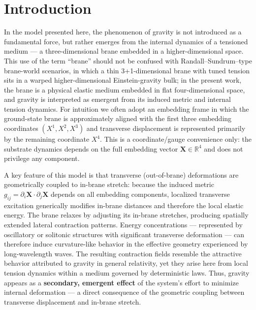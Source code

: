 \section{Introduction}\label{introduction}

In the model presented here, the phenomenon of gravity is not introduced
as a fundamental force, but rather emerges from the internal dynamics of
a tensioned medium --- a three-dimensional brane embedded in a
higher-dimensional space. This use of the term ``brane'' should not be confused with Randall--Sundrum--type brane-world scenarios, in which a thin 3+1-dimensional brane with tuned tension sits in a warped higher-dimensional Einstein-gravity bulk; in the present work, the brane is a physical elastic medium embedded in flat four-dimensional space, and gravity is interpreted as emergent from its induced metric and internal tension dynamics. For intuition we often adopt an embedding frame in which the ground-state brane is approximately aligned with the first three embedding coordinates $(X^1,X^2,X^3)$ and transverse displacement is represented primarily by the remaining coordinate $X^4$. This is a coordinate/gauge convenience only: the substrate dynamics depends on the full embedding vector $\mathbf X\in\mathbb R^4$ and does not privilege any component.

A key feature of this model is that transverse (out-of-brane) deformations are
geometrically coupled to in-brane stretch: because the induced metric
$g_{ij}=\partial_i\mathbf X\cdot\partial_j\mathbf X$ depends on all embedding
components, localized transverse excitation generically modifies in-brane
distances and therefore the local elastic energy. The brane relaxes by adjusting
its in-brane stretches, producing spatially extended lateral contraction
patterns. Energy concentrations --- represented by oscillatory or solitonic
structures with significant transverse deformation --- can therefore induce
curvature-like behavior in the effective geometry experienced by long-wavelength
waves. The resulting contraction fields resemble the attractive behavior
attributed to gravity in general relativity, yet they arise here from local
tension dynamics within a medium governed by deterministic laws. Thus, gravity
appears as a \textbf{secondary, emergent effect} of the system's effort to
minimize internal deformation --- a direct consequence of the geometric coupling
between transverse displacement and in-brane stretch.

